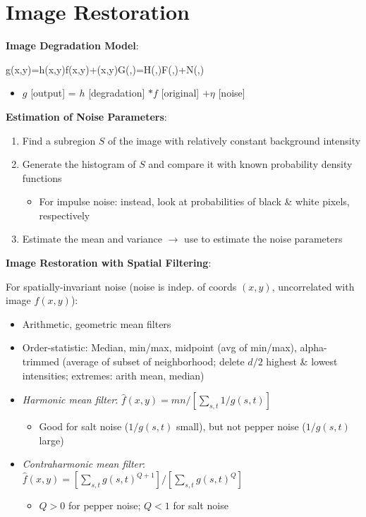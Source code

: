 \documentclass[12pt]{extarticle}
\begin{document}
\section{Image Restoration}
\textbf{Image Degradation Model}: \begin{eqnbox}
    g(x,y)=h(x,y)\ast f(x,y)+\eta(x,y)\Longleftrightarrow G(\mu,\nu)=H(\mu,\nu)F(\mu,\nu)+N(\mu,\nu)
\end{eqnbox}
\begin{itemize}
    \item $g$ [output] = $h$ [degradation] $\ast f$ [original] $+\eta$ [noise]
\end{itemize}

\newp
\textbf{Estimation of Noise Parameters}: \begin{enumerate}
    \item Find a subregion $S$ of the image with relatively constant background intensity
    \item Generate the histogram of $S$ and compare it with known probability density functions \begin{itemize}
        \item For impulse noise: instead, look at probabilities of black \& white pixels, respectively
    \end{itemize}
    \item Estimate the mean and variance $\longrightarrow$ use to estimate the noise parameters
\end{enumerate}

\newp
\textbf{Image Restoration with Spatial Filtering}: 

\newp
For spatially-invariant noise (noise is indep. of coords $(x,y)$, uncorrelated with image $f(x,y)$):
\begin{itemize}
    \item Arithmetic, geometric mean filters
    \item Order-statistic: Median, min/max, midpoint (avg of min/max), alpha-trimmed (average of subset of neighborhood; delete $d/2$ highest \& lowest intensities; extremes: arith mean, median)
    \item \textit{Harmonic mean filter}: $\hat{f}(x,y)=mn/\left[\sum_{s,t}1/g(s,t)\right]$ \begin{itemize}
        \item Good for salt noise ($1/g(s,t)$ small), but not pepper noise ($1/g(s,t)$ large)
    \end{itemize}
    \item \textit{Contraharmonic mean filter}: $\hat{f}(x,y)=\left[\sum_{s,t}g(s,t)^{Q+1}\right]/\left[\sum_{s,t}g(s,t)^{Q}\right]$ \begin{itemize}
        \item $Q>0$ for pepper noise; $Q<1$ for salt noise
    \end{itemize}
\end{itemize}
\end{document}

